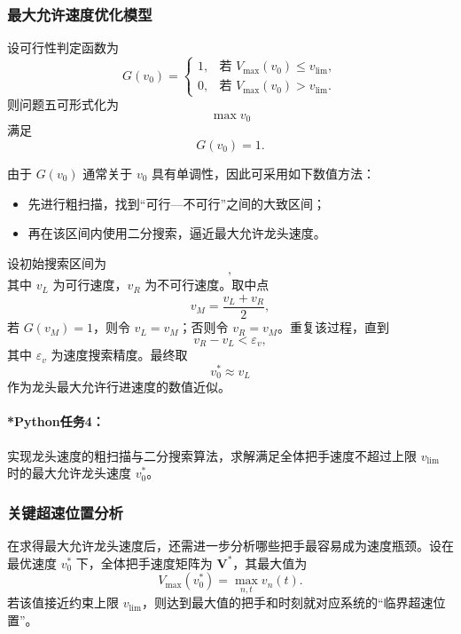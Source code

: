 \documentclass[12pt,a4paper]{ctexart}
\begin{document}
\subsubsection{最大允许速度优化模型}
设可行性判定函数为
\begin{equation}
G(v_0)=
\begin{cases}
1, & \text{若 } V_{\max}(v_0)\le v_{\mathrm{lim}},\\
0, & \text{若 } V_{\max}(v_0)>v_{\mathrm{lim}}.
\end{cases}
\end{equation}
则问题五可形式化为
\begin{equation}
\max v_0
\end{equation}
满足
\begin{equation}
G(v_0)=1.
\end{equation}

由于 $G(v_0)$ 通常关于 $v_0$ 具有单调性，因此可采用如下数值方法：

\begin{itemize}
    \item 先进行粗扫描，找到“可行—不可行”之间的大致区间；
    \item 再在该区间内使用二分搜索，逼近最大允许龙头速度。
\end{itemize}

设初始搜索区间为
\begin{equation}
[v_L,v_R],
\end{equation}
其中 $v_L$ 为可行速度，$v_R$ 为不可行速度。取中点
\begin{equation}
v_M=\frac{v_L+v_R}{2},
\end{equation}
若 $G(v_M)=1$，则令 $v_L=v_M$；否则令 $v_R=v_M$。重复该过程，直到
\begin{equation}
v_R-v_L<\varepsilon_v,
\end{equation}
其中 $\varepsilon_v$ 为速度搜索精度。最终取
\begin{equation}
v_0^\ast\approx v_L
\end{equation}
作为龙头最大允许行进速度的数值近似。

\paragraph{*Python任务4：}
实现龙头速度的粗扫描与二分搜索算法，求解满足全体把手速度不超过上限 $v_{\mathrm{lim}}$ 时的最大允许龙头速度 $v_0^\ast$。

\subsubsection{关键超速位置分析}
在求得最大允许龙头速度后，还需进一步分析哪些把手最容易成为速度瓶颈。设在最优速度 $v_0^\ast$ 下，全体把手速度矩阵为 $\bm{V}^\ast$，其最大值为
\begin{equation}
V_{\max}(v_0^\ast)=\max_{n,t} v_n(t).
\end{equation}
若该值接近约束上限 $v_{\mathrm{lim}}$，则达到最大值的把手和时刻就对应系统的“临界超速位置”。
\end{document}
